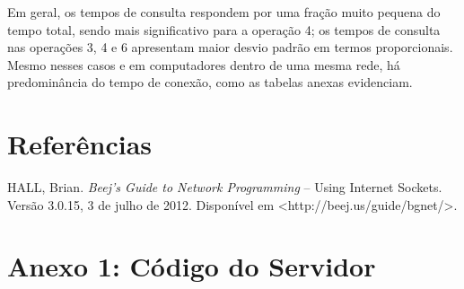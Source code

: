 \documentclass[11pt, brazil]{article} %
\begin{document}
Em geral, os tempos de consulta respondem por uma fração muito pequena do tempo total, sendo mais significativo para a operação 4; os tempos de consulta nas operações 3, 4 e 6 apresentam maior desvio padrão em termos proporcionais. 
Mesmo nesses casos e em computadores dentro de uma mesma rede, há predominância do tempo de conexão, como as tabelas anexas evidenciam.

\section{Referências}

HALL, Brian. \emph{Beej's Guide to Network Programming} -- Using Internet Sockets. Versão 3.0.15, 3 de julho de 2012. Disponível em <http://beej.us/guide/bgnet/>.

\section*{Anexo 1: Código do Servidor}
\end{document}
